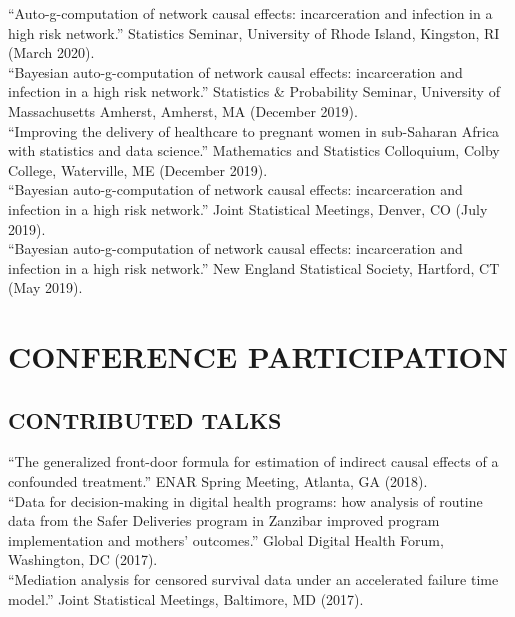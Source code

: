 \documentclass[12pt]{article}
\begin{document}
``Auto-g-computation of network causal effects: incarceration and infection in a high risk network.'' Statistics Seminar, University of Rhode Island, Kingston, RI (March 2020). \\

``Bayesian auto-g-computation of network causal effects: incarceration and infection in a high risk network.'' Statistics \& Probability Seminar, University of Massachusetts Amherst, Amherst, MA (December 2019). \\

``Improving the delivery of healthcare to pregnant women in sub-Saharan Africa with statistics and data science.'' Mathematics and Statistics Colloquium, Colby College, Waterville, ME (December 2019). \\ 

``Bayesian auto-g-computation of network causal effects: incarceration and infection in a high risk network.'' Joint Statistical Meetings, Denver, CO (July 2019). \\

``Bayesian auto-g-computation of network causal effects: incarceration and infection in a high risk network.'' New England Statistical Society, Hartford, CT (May 2019). 

\section*{\textbf{{\large C}{ONFERENCE} {\large P}{ARTICIPATION}}}  

\subsection*{\textbf{CONTRIBUTED TALKS}}


``The generalized front-door formula for estimation of indirect causal effects of a confounded treatment.'' ENAR Spring Meeting, Atlanta, GA (2018). \\

``Data for decision-making in digital health programs: how analysis of routine data from the Safer Deliveries program in Zanzibar improved program implementation and mothers' outcomes.'' Global Digital Health Forum, Washington, DC (2017). \\

``Mediation analysis for censored survival data under an accelerated failure time model.'' Joint Statistical Meetings, Baltimore, MD (2017). \\
\end{document}
